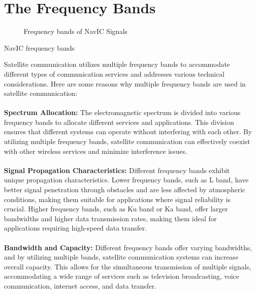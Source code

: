 \section{The Frequency Bands}
	\begin{figure}[!ht]
	\centering
	
	\caption{Frequency bands of NavIC Signals}
	\label{figure:bandsfig}
	\end{figure}

\begin{table}[!ht]
	\small
	\centering
	
	\caption{NavIC frequency bands}
	\label{table:bands}
	\end{table}

\noindent Satellite communication utilizes multiple frequency bands to accommodate different types of communication services and addresses various technical considerations. Here are some reasons why multiple frequency bands are used in satellite communication:
\\
\\
\textbf{Spectrum Allocation:} The electromagnetic spectrum is divided into various frequency bands to allocate different services and applications. This division ensures that different systems can operate without interfering with each other. By utilizing multiple frequency bands, satellite communication can effectively coexist with other wireless services and minimize interference issues.
\\
\\
\textbf{Signal Propagation Characteristics:} Different frequency bands exhibit unique propagation characteristics. Lower frequency bands, such as L band, have better signal penetration through obstacles and are less affected by atmospheric conditions, making them suitable for applications where signal reliability is crucial. Higher frequency bands, such as Ku band or Ka band, offer larger bandwidths and higher data transmission rates, making them ideal for applications requiring high-speed data transfer.
\\
\\
\textbf{Bandwidth and Capacity:} Different frequency bands offer varying bandwidths, and by utilizing multiple bands, satellite communication systems can increase overall capacity. This allows for the simultaneous transmission of multiple signals, accommodating a wide range of services such as television broadcasting, voice communication, internet access, and data transfer.
\\
\\
